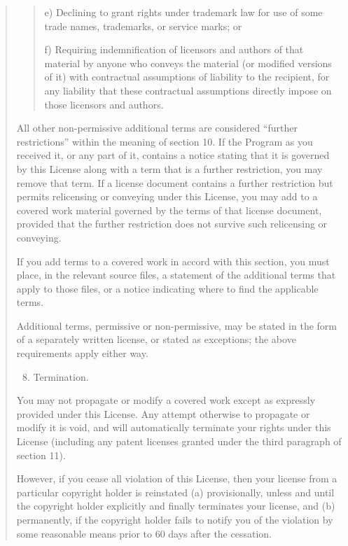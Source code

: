 \documentclass[letterpaper,10pt,english]{sphinxmanual}
\begin{document}
\begin{quote}
\begin{quote}
e) Declining to grant rights under trademark law for use of some
trade names, trademarks, or service marks; or

f) Requiring indemnification of licensors and authors of that
material by anyone who conveys the material (or modified versions of
it) with contractual assumptions of liability to the recipient, for
any liability that these contractual assumptions directly impose on
those licensors and authors.
\end{quote}

All other non-permissive additional terms are considered ``further
restrictions'' within the meaning of section 10.  If the Program as you
received it, or any part of it, contains a notice stating that it is
governed by this License along with a term that is a further
restriction, you may remove that term.  If a license document contains
a further restriction but permits relicensing or conveying under this
License, you may add to a covered work material governed by the terms
of that license document, provided that the further restriction does
not survive such relicensing or conveying.

If you add terms to a covered work in accord with this section, you
must place, in the relevant source files, a statement of the
additional terms that apply to those files, or a notice indicating
where to find the applicable terms.

Additional terms, permissive or non-permissive, may be stated in the
form of a separately written license, or stated as exceptions;
the above requirements apply either way.
\begin{enumerate}
\setcounter{enumi}{7}
\item {} 
Termination.

\end{enumerate}

You may not propagate or modify a covered work except as expressly
provided under this License.  Any attempt otherwise to propagate or
modify it is void, and will automatically terminate your rights under
this License (including any patent licenses granted under the third
paragraph of section 11).

However, if you cease all violation of this License, then your
license from a particular copyright holder is reinstated (a)
provisionally, unless and until the copyright holder explicitly and
finally terminates your license, and (b) permanently, if the copyright
holder fails to notify you of the violation by some reasonable means
prior to 60 days after the cessation.


\end{quote}
\end{document}
